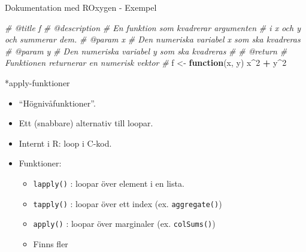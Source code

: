 \documentclass[
  11pt,
  ignorenonframetext,
]{beamer}
\newenvironment{Shaded}{\begin{snugshade}}{\end{snugshade}}
\newcommand{\CommentTok}[1]{\textcolor[rgb]{0.56,0.35,0.01}{\textit{#1}}}
\newcommand{\ControlFlowTok}[1]{\textcolor[rgb]{0.13,0.29,0.53}{\textbf{#1}}}
\newcommand{\DecValTok}[1]{\textcolor[rgb]{0.00,0.00,0.81}{#1}}
\newcommand{\NormalTok}[1]{#1}
\newcommand{\OtherTok}[1]{\textcolor[rgb]{0.56,0.35,0.01}{#1}}
\newcommand{\SpecialCharTok}[1]{\textcolor[rgb]{0.81,0.36,0.00}{\textbf{#1}}}
\providecommand{\tightlist}{%
  \setlength{\itemsep}{0pt}\setlength{\parskip}{0pt}}
\begin{document}
\begin{frame}[fragile]{Dokumentation med ROxygen - Exempel}
\label{dokumentation-med-roxygen---exempel}
\begin{Shaded}
\begin{Highlighting}[]
\CommentTok{\#\textquotesingle{} @title f}
\CommentTok{\#\textquotesingle{} @description}
\CommentTok{\#\textquotesingle{} En funktion som kvadrerar argumenten }
\CommentTok{\#\textquotesingle{} i x och y och summerar dem. }
\CommentTok{\#\textquotesingle{} @param x}
\CommentTok{\#\textquotesingle{} Den numeriska variabel x som ska kvadreras}
\CommentTok{\#\textquotesingle{} @param y}
\CommentTok{\#\textquotesingle{} Den numeriska variabel y som ska kvadreras}
\CommentTok{\#\textquotesingle{}}
\CommentTok{\#\textquotesingle{} @return}
\CommentTok{\#\textquotesingle{} Funktionen returnerar en numerisk vektor}
\CommentTok{\#\textquotesingle{}}
\NormalTok{f }\OtherTok{\textless{}{-}} \ControlFlowTok{function}\NormalTok{(x, y) x}\SpecialCharTok{\^{}}\DecValTok{2} \SpecialCharTok{+}\NormalTok{ y}\SpecialCharTok{\^{}}\DecValTok{2}
\end{Highlighting}
\end{Shaded}
\end{frame}

\begin{frame}{*apply-funktioner}
\label{apply-funktioner}
\begin{itemize}
\tightlist
\item
  ``Högnivåfunktioner''.
\item
  Ett (snabbare) alternativ till loopar.
\item
  Internt i R: loop i C-kod.
\item
  Funktioner:

  \begin{itemize}
  \tightlist
  \item
    \texttt{lapply()} : loopar över element i en lista.
  \item
    \texttt{tapply()} : loopar över ett index (ex. \texttt{aggregate()})
  \item
    \texttt{apply()} : loopar över marginaler (ex. \texttt{colSums()})
  \item
    Finns fler
  \end{itemize}
\end{itemize}
\end{frame}
\end{document}
